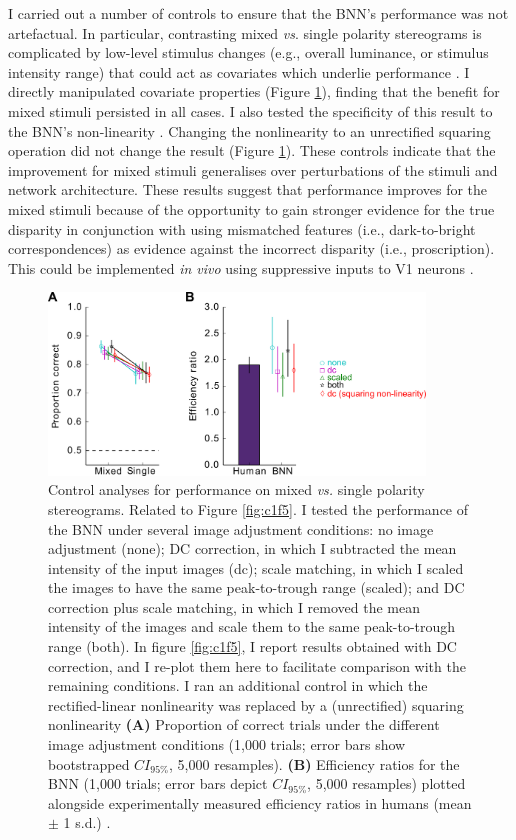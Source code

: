 {I carried out a number of controls to ensure that the BNN's performance was not artefactual. In particular, contrasting mixed {\it vs}. single polarity stereograms is complicated by low-level stimulus changes (e.g., overall luminance, or stimulus intensity range) that could act as covariates which underlie performance \cite{Read:2011im}. I directly manipulated covariate properties (Figure \ref{fig:c1fs4}), finding that the benefit for mixed stimuli persisted in all cases. I also tested the specificity of this result to the BNN's non-linearity \cite{Read:2011im}. Changing the nonlinearity to an unrectified squaring operation did not change the result (Figure \ref{fig:c1fs4}). These controls indicate that the improvement for mixed stimuli generalises over perturbations of the stimuli and network architecture. These results suggest that performance improves for the mixed stimuli because of the opportunity to gain stronger evidence for the true disparity in conjunction with using mismatched features (i.e., dark-to-bright correspondences) as evidence against the incorrect disparity (i.e., proscription). This could be implemented {\it in vivo} using suppressive inputs to V1 neurons \cite{Tanabe:2011pt}.

\begin{figure}[!h]
  \centering
  \includegraphics[width=10cm,keepaspectratio]{FigS4.png}
  \caption[Controls for performance on mixed and single polarity stimuli.]{Control analyses for performance on mixed \textit{vs.} single polarity stereograms. Related to Figure \ref{fig:c1f5}. I tested the performance of the BNN under several image adjustment conditions: no image adjustment (none); DC correction, in which I subtracted the mean intensity of the input images (dc); scale matching, in which I scaled the images to have the same peak-to-trough range (scaled); and DC correction plus scale matching, in which I removed the mean intensity of the images and scale them to the same peak-to-trough range (both). In figure \ref{fig:c1f5}, I report results obtained with DC correction, and I re-plot them here to facilitate comparison with the remaining conditions. I ran an additional control in which the rectified-linear nonlinearity was replaced by a (unrectified) squaring nonlinearity \textbf{(A)} Proportion of correct trials under the different image adjustment conditions (1,000 trials; error bars show bootstrapped $CI_{95\%}$, 5,000 resamples). \textbf{(B)} Efficiency ratios for the BNN (1,000 trials; error bars depict $CI_{95\%}$, 5,000 resamples) plotted alongside experimentally measured efficiency ratios in humans (mean $\pm$ 1 s.d.) \cite{Harris:1995va}.} 
  \label{fig:c1fs4}
\end{figure}

}

